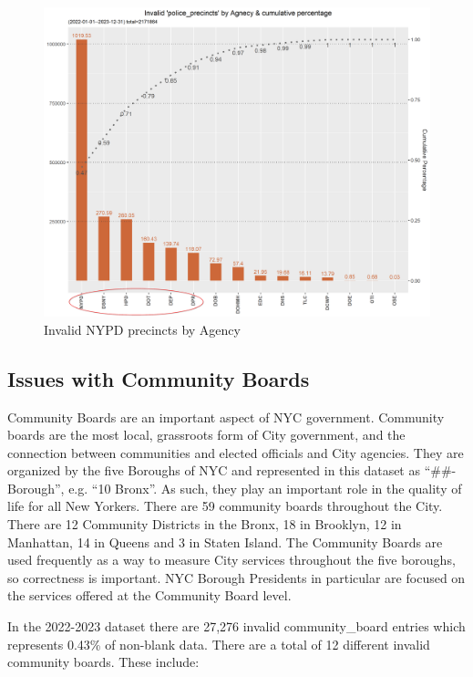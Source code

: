 \documentclass[12pt, titlepage]{article}
\begin{document}
	\begin{figure}[H]
	  \centering
		  \includegraphics[width=\textwidth]{invalid_police_precincts.png}
		  \caption{Invalid NYPD precincts by Agency}
		  \label{fig:invalid_police_precincts_zip}
	\end{figure}

	\subsection{Issues with Community Boards}
	Community Boards are an important aspect of NYC government. Community boards are the most local, grassroots form of City government, 
	and the connection between communities and elected officials and City agencies. They are organized by the five Boroughs of NYC and represented
	in this dataset as ``\#\#-Borough'', e.g. ``10 Bronx''. As such, they play an important role in the quality of life for all New Yorkers. There are 59 community boards 
	throughout the City. There are 12 Community Districts in the Bronx, 18 in Brooklyn, 12 in Manhattan, 14 in Queens and 3 in Staten Island. The Community Boards are
	used frequently as a way to measure City services throughout the five boroughs, so correctness is important. NYC Borough Presidents in particular are focused
	on the services offered at the Community Board level.
	
	In the 2022-2023 dataset there are 27,276 invalid community\_board entries which represents 0.43\% of non-blank data. There are a total of 12 different invalid community boards.
	These include: 
	
\end{document}
